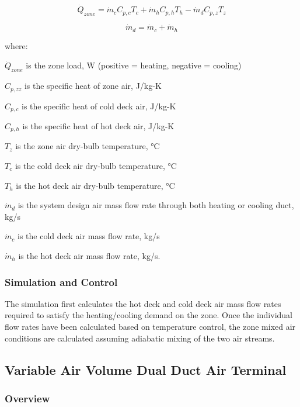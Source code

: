 \begin{equation}
\dot Q_{zone} = \dot m_c C_{p,c} T_c + \dot m_h C_{p,h}T_h - \dot m_d C_{p,z} T_z
\end{equation}

\begin{equation}
\dot m_d = \dot m_c + \dot m_h
\end{equation}

where:

\(\dot Q_{zone}\) is the zone load, W (positive = heating, negative = cooling)

\(C_{p,zz}\) is the specific heat of zone air, J/kg-K

\(C_{p,c}\) is the specific heat of cold deck air, J/kg-K

\(C_{p,h}\) is the specific heat of hot deck air, J/kg-K

\({T_z}\) is the zone air dry-bulb temperature, °C

\({T_c}\) is the cold deck air dry-bulb temperature, °C

\({T_h}\) is the hot deck air dry-bulb temperature, °C

\({\dot m_d}\) is the system design air mass flow rate through both heating or cooling duct, kg/s

\({\dot m_c}\) is the cold deck air mass flow rate, kg/s

\({\dot m_h}\) is the hot deck air mass flow rate, kg/s.

\subsubsection{Simulation and Control}\label{simulation-and-control-5}

The simulation first calculates the hot deck and cold deck air mass flow rates required to satisfy the heating/cooling demand on the zone. Once the individual flow rates have been calculated based on temperature control, the zone mixed air conditions are calculated assuming adiabatic mixing of the two air streams.

\subsection{Variable Air Volume Dual Duct Air Terminal}\label{variable-air-volume-dual-duct-air-terminal}

\subsubsection{Overview}\label{overview-4-000}

